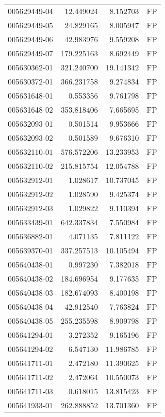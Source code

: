 \begin{tabular}{lrrl}
005629449-04 &   12.449024 &     8.152703 &   FP \\
005629449-05 &   24.829165 &     8.005947 &   FP \\
005629449-06 &   42.983976 &     9.559208 &   FP \\
005629449-07 &  179.225163 &     8.692449 &   FP \\
005630362-01 &  321.240700 &    19.141342 &   FP \\
005630372-01 &  366.231758 &     9.274834 &   FP \\
005631648-01 &    0.553356 &     9.761798 &   FP \\
005631648-02 &  353.818406 &     7.665695 &   FP \\
005632093-01 &    0.501514 &     9.953666 &   FP \\
005632093-02 &    0.501589 &     9.676310 &   FP \\
005632110-01 &  576.572206 &    13.233953 &   FP \\
005632110-02 &  215.815754 &    12.054788 &   FP \\
005632912-01 &    1.028617 &    10.737045 &   FP \\
005632912-02 &    1.028590 &     9.425374 &   FP \\
005632912-03 &    1.029822 &     9.110394 &   FP \\
005633439-01 &  642.337834 &     7.550984 &   FP \\
005636882-01 &    4.071135 &     7.811122 &   FP \\
005639370-01 &  337.257513 &    10.105494 &   FP \\
005640438-01 &    0.997230 &     7.382018 &   FP \\
005640438-02 &  184.696954 &     9.177635 &   FP \\
005640438-03 &  182.674093 &     8.400198 &   FP \\
005640438-04 &   42.912540 &     7.763824 &   FP \\
005640438-05 &  255.235598 &     8.909798 &   FP \\
005641294-01 &    3.272352 &     9.165196 &   FP \\
005641294-02 &    6.547130 &    11.986785 &   FP \\
005641711-01 &    2.472180 &    11.390625 &   FP \\
005641711-02 &    2.472064 &    10.550073 &   FP \\
005641711-03 &    0.618015 &    13.815423 &   FP \\
005641933-01 &  262.888852 &    13.701360 &   FP \\

\end{tabular}
